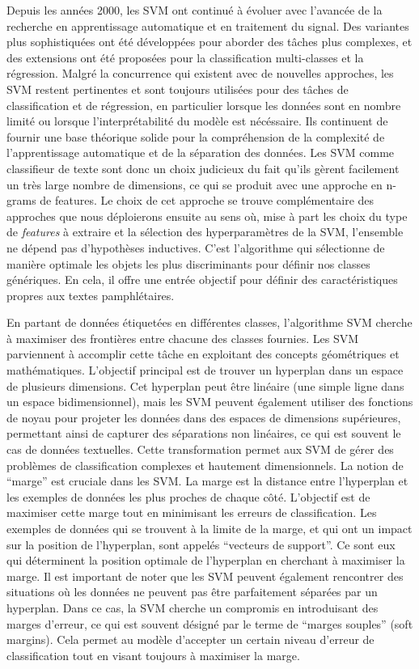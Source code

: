 Depuis les années 2000, les SVM ont continué à évoluer avec l'avancée de la recherche en apprentissage automatique et en traitement du signal. Des variantes plus sophistiquées ont été développées pour aborder des tâches plus complexes, et des extensions ont été proposées pour la classification multi-classes et la régression. Malgré la concurrence qui existent avec de nouvelles approches, les SVM restent pertinentes et sont toujours utilisées pour des tâches de classification et de régression, en particulier lorsque les données sont en nombre limité ou lorsque l'interprétabilité du modèle est nécéssaire. Ils continuent de fournir une base théorique solide pour la compréhension de la complexité de l'apprentissage automatique et de la séparation des données. Les SVM comme classifieur de texte sont donc un choix judicieux du fait qu'ils gèrent facilement un très large nombre de dimensions, ce qui se produit avec une approche en n-grams de features.
Le choix de cet approche se trouve complémentaire des approches que nous déploierons ensuite au sens où, mise à part les choix du type de \textit{features} à extraire et la sélection des hyperparamètres de la SVM, l'ensemble ne dépend pas d'hypothèses inductives. C'est l'algorithme qui sélectionne de manière optimale les objets les plus discriminants pour définir nos classes génériques. En cela, il offre une entrée objectif pour définir des caractéristiques propres aux textes pamphlétaires.


En partant de données étiquetées en différentes classes, l'algorithme SVM cherche à maximiser des frontières entre chacune des classes fournies. Les SVM parviennent à accomplir cette tâche en exploitant des concepts géométriques et mathématiques. L'objectif principal est de trouver un hyperplan dans un espace de plusieurs dimensions. Cet hyperplan peut être linéaire (une simple ligne dans un espace bidimensionnel), mais les SVM peuvent également utiliser des fonctions de noyau pour projeter les données dans des espaces de dimensions supérieures, permettant ainsi de capturer des séparations non linéaires, ce qui est souvent le cas de données textuelles. Cette transformation permet aux SVM de gérer des problèmes de classification complexes et hautement dimensionnels. La notion de \enquote{marge} est cruciale dans les SVM. La marge est la distance entre l'hyperplan et les exemples de données les plus proches de chaque côté. L'objectif est de maximiser cette marge tout en minimisant les erreurs de classification. Les exemples de données qui se trouvent à la limite de la marge, et qui ont un impact sur la position de l'hyperplan, sont appelés \enquote{vecteurs de support}. Ce sont eux qui déterminent la position optimale de l'hyperplan en cherchant à maximiser la marge. 
Il est important de noter que les SVM peuvent également rencontrer des situations où les données ne peuvent pas être parfaitement séparées par un hyperplan. Dans ce cas, la SVM cherche un compromis en introduisant des marges d'erreur, ce qui est souvent désigné par le terme de \enquote{marges souples} (soft margins). Cela permet au modèle d'accepter un certain niveau d'erreur de classification tout en visant toujours à maximiser la marge.

